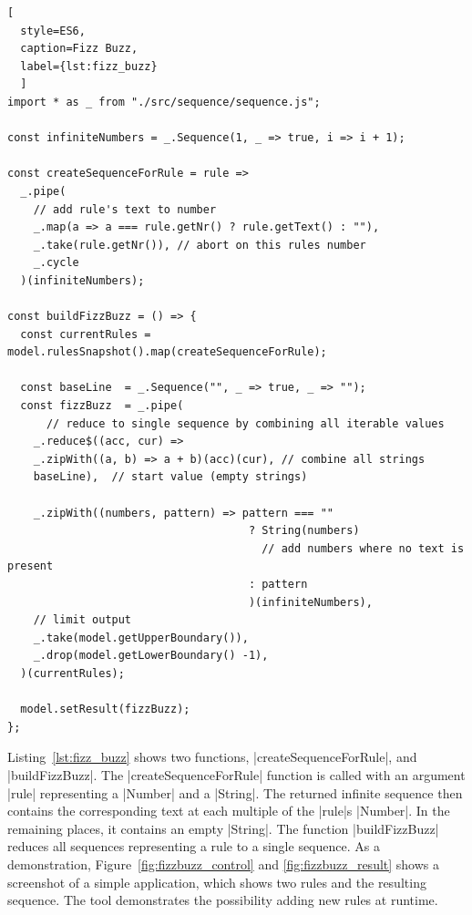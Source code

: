 \begin{lstlisting}[
  style=ES6, 
  caption=Fizz Buzz,
  label={lst:fizz_buzz}
  ]
import * as _ from "./src/sequence/sequence.js";

const infiniteNumbers = _.Sequence(1, _ => true, i => i + 1);

const createSequenceForRule = rule =>
  _.pipe(
    // add rule's text to number
    _.map(a => a === rule.getNr() ? rule.getText() : ""),     
    _.take(rule.getNr()), // abort on this rules number
    _.cycle
  )(infiniteNumbers);

const buildFizzBuzz = () => {
  const currentRules = model.rulesSnapshot().map(createSequenceForRule);

  const baseLine  = _.Sequence("", _ => true, _ => "");
  const fizzBuzz  = _.pipe(
      // reduce to single sequence by combining all iterable values
    _.reduce$((acc, cur) =>       
    _.zipWith((a, b) => a + b)(acc)(cur), // combine all strings
    baseLine),  // start value (empty strings)

    _.zipWith((numbers, pattern) => pattern === "" 
                                     ? String(numbers) 
                                       // add numbers where no text is present
                                     : pattern
                                     )(infiniteNumbers), 
    // limit output
    _.take(model.getUpperBoundary()),
    _.drop(model.getLowerBoundary() -1),
  )(currentRules);

  model.setResult(fizzBuzz);
};
\end{lstlisting}
Listing~\ref{lst:fizz_buzz} shows two functions, |createSequenceForRule|, and
|buildFizzBuzz|. 
The |createSequenceForRule| function is called with an argument |rule| representing a
|Number| and a |String|. The returned infinite sequence then contains the
corresponding text at each multiple of the |rule|s |Number|. In the remaining places, it
contains an empty |String|. The function |buildFizzBuzz| reduces all sequences
representing a rule to a single sequence. As a demonstration,
Figure~\ref{fig:fizzbuzz_control} and \ref{fig:fizzbuzz_result} shows a
screenshot of a simple application, which shows two rules and the resulting
sequence. The tool demonstrates the possibility adding new rules at runtime. 


